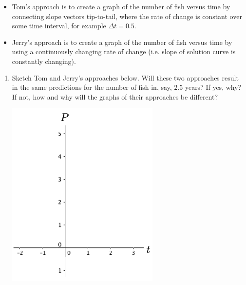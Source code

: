\begin{itemize}
\item	Tom's approach is to create a graph of the number of fish versus time by connecting slope vectors tip-to-tail, where the rate of change is constant over some time interval, for example $\Delta t=0.5$. 
\item Jerry's approach is to create a graph of the number of fish versus time by using a continuously changing rate of change (i.e. slope of solution curve is constantly changing). 

\end{itemize}
\begin{enumerate}

\item Sketch Tom and Jerry's approaches below. Will these two approaches result in the same predictions for the number of fish in, say, $2.5$ years? If yes, why? If not, how and why will the graphs of their approaches be different?\label{05problem1}
\begin{center}
\includegraphics[width=3in]{05/05TomJerry.png}
\end{center}
\end{enumerate}
\clearpage


